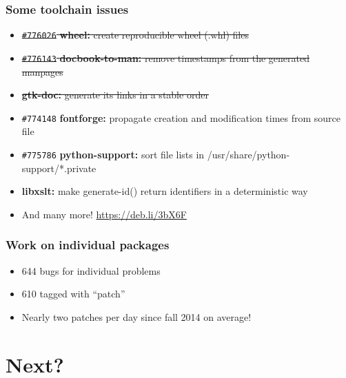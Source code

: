 \documentclass[14pt,aspectratio=169]{beamer}
\begin{document}
\begin{frame}
 \frametitle{Some toolchain issues}

 \begin{itemize}\small
  \item \sout{\texttt{\#776026} \textbf{wheel:} create reproducible wheel (.whl) files}
  \item \sout{\texttt{\#776143} \textbf{docbook-to-man:} remove timestamps from the generated manpages}
  \item \sout{\textbf{gtk-doc:} generate its links in a stable order}
  \item \texttt{\#774148} \textbf{fontforge:} propagate creation and modification times from source file
  \item \texttt{\#775786} \textbf{python-support:} sort file lists in /usr/share/python-support/*.private
  \item \textbf{libxslt:} make generate-id() return identifiers in a deterministic way
  \item And many more! \url{https://deb.li/3bX6F}
 \end{itemize}
\end{frame}

\begin{frame}
 \frametitle{Work on individual packages}

 \begin{itemize}
  \item 644 bugs for individual problems
  \item 610 tagged with “patch”
  \item Nearly two patches per day since fall 2014 on average!
 \end{itemize}
\end{frame}

\begin{frame}[plain]
\end{frame}

\section{Next?}
\end{document}
